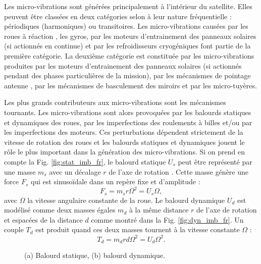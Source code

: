 Les micro-vibrations sont g\'en\'er\'ees principalement \`a l'int\'erieur du satellite. Elles peuvent être classées en deux cat\'egories selon à leur nature fr\'equentielle : p\'eriodiques (harmoniques) ou transitoires. Les micro-vibrations caus\'ees par les roues \`a r\'eaction \cite{miller2007reaction}, les gyros, par les moteurs d'entrainement des panneaux solaires \cite{man1990} (si actionn\'es en continue) et par les refroidisseurs cryog\'eniques \cite{kim2011} font partie de la première catégorie. La deuxi\`eme cat\'egorie est constitu\'ee par les micro-vibrations produites par les moteurs d'entrainement des panneaux solaires (si actionn\'es pendant des phases particuli\`eres de la mission), par les m\'ecanismes de pointage antenne \cite{arnon1997}, par les m\'ecanismes de basculement des miroirs et par les micro-tuy\`eres. 

Les plus grands contributeurs aux micro-vibrations sont les m\'ecanismes tournants. Les micro-vibrations sont alors provoqu\'ees par les balourds statiques et dynamiques des roues, par les imperfections des roulements \`a billes et/ou par les imperfections des moteurs. Ces perturbations d\'ependent strictement de la vitesse de rotation des roues et les balourds statiques et dynamiques jouent le r\^ole le plus important dans la génération des micro-vibrations. 
Si on prend en compte la Fig. \ref{fig:stat_imb_fr}, le balourd statique $U_s$ peut être repr\'esent\'e par une masse $m_s$ avec un d\'ecalage $r$ de l'axe de rotation \cite{CRS13}. Cette masse génère une force $F_s$ qui est sinusoïdale dans un rep\`ere fixe et d'amplitude :
\begin{equation}
F_s = m_s r \Omega^2 = U_s \Omega,
\end{equation}
avec $\Omega$ la vitesse angulaire constante de la roue. 
Le balourd dynamique $U_d$ est mod\'elis\'e comme deux masses \'egales $m_d$ \`a la même distance $r$ de l'axe de rotation et espac\'ees de la distance $d$ comme montr\'e dans la Fig. \ref{fig:dyn_imb_fr}. Un couple $T_d$ est produit quand ces deux masses tournent \`a la vitesse constante $\Omega$ :
\begin{equation}
	T_d = m_drd\Omega^2=U_d\Omega^2.
\end{equation} 

\begin{figure}[!h]%
    \centering
    \qquad
    \caption{(a) Balourd statique, (b) balourd dynamique.}%
    \label{fig:rw_imb_fr}%
\end{figure}


